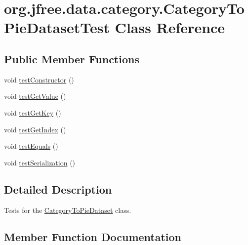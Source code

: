\hypertarget{classorg_1_1jfree_1_1data_1_1category_1_1_category_to_pie_dataset_test}{}\section{org.\+jfree.\+data.\+category.\+Category\+To\+Pie\+Dataset\+Test Class Reference}
\label{classorg_1_1jfree_1_1data_1_1category_1_1_category_to_pie_dataset_test}
\subsection*{Public Member Functions}
\begin{DoxyCompactItemize}
\item 
void \mbox{\hyperlink{classorg_1_1jfree_1_1data_1_1category_1_1_category_to_pie_dataset_test_a89bde1d1f9a5522b04c35c9000e0403b}{test\+Constructor}} ()
\item 
void \mbox{\hyperlink{classorg_1_1jfree_1_1data_1_1category_1_1_category_to_pie_dataset_test_a16ab91132541a30d67e6fa6fd7ed42a0}{test\+Get\+Value}} ()
\item 
void \mbox{\hyperlink{classorg_1_1jfree_1_1data_1_1category_1_1_category_to_pie_dataset_test_a484948fde9c4b4069643dfdcea7a6c24}{test\+Get\+Key}} ()
\item 
void \mbox{\hyperlink{classorg_1_1jfree_1_1data_1_1category_1_1_category_to_pie_dataset_test_a3a53eebdcfe4f3f5ed9e2ba5313461d3}{test\+Get\+Index}} ()
\item 
void \mbox{\hyperlink{classorg_1_1jfree_1_1data_1_1category_1_1_category_to_pie_dataset_test_a13f9191a1583e9a170082be105439e5f}{test\+Equals}} ()
\item 
void \mbox{\hyperlink{classorg_1_1jfree_1_1data_1_1category_1_1_category_to_pie_dataset_test_a0adc4acc84d00eba0fdc83c0b566d82e}{test\+Serialization}} ()
\end{DoxyCompactItemize}


\subsection{Detailed Description}
Tests for the \mbox{\hyperlink{classorg_1_1jfree_1_1data_1_1category_1_1_category_to_pie_dataset}{Category\+To\+Pie\+Dataset}} class. 

\subsection{Member Function Documentation}
\mbox{\label{classorg_1_1jfree_1_1data_1_1category_1_1_category_to_pie_dataset_test_a89bde1d1f9a5522b04c35c9000e0403b}} 
